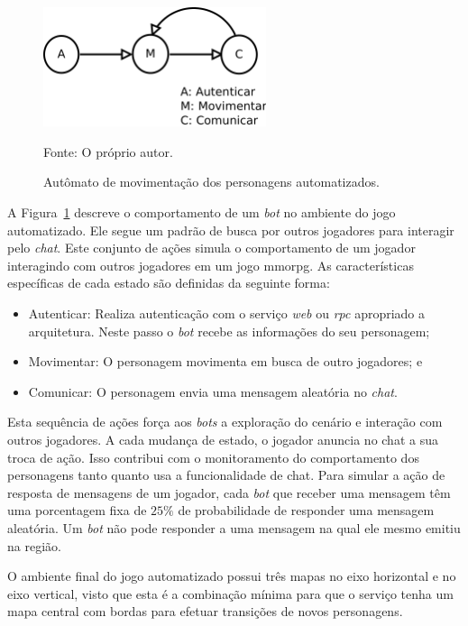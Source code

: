 \begin{figure}[htb!]
  \caption{Autômato de movimentação dos personagens automatizados.}
  \label{fig:movimentacao}
  \includegraphics[height=3.5cm]{img/cap3/movimentacao.png}
  \centering

  Fonte: O próprio autor.
\end{figure}

A Figura~\ref{fig:movimentacao} descreve o comportamento de um \textit{bot} no ambiente do jogo automatizado.
%
Ele segue um padrão de busca por outros jogadores para interagir pelo \textit{chat}.
%
Este conjunto de ações simula o comportamento de um jogador interagindo com outros jogadores em um jogo \ac{mmorpg}.
%
As características específicas de cada estado são definidas da seguinte forma:

\begin{itemize}
  \item Autenticar: Realiza autenticação com o serviço \textit{web} ou \textit{rpc} apropriado a arquitetura. Neste passo o \textit{bot} recebe as informações do seu personagem;
  \item Movimentar: O personagem movimenta em busca de outro jogadores; e
  \item Comunicar: O personagem envia uma mensagem aleatória no \textit{chat}.
\end{itemize}

Esta sequência de ações força aos \textit{bots} a exploração do cenário e interação com outros jogadores.
%
A cada mudança de estado, o jogador anuncia no chat a sua troca de ação.
%
Isso contribui com o monitoramento do comportamento dos personagens tanto quanto usa a funcionalidade de chat.
%
Para simular a ação de resposta de mensagens de um jogador, cada \textit{bot} que receber uma mensagem têm uma porcentagem fixa de $25\%$ de probabilidade de responder uma mensagem aleatória.
%
Um \textit{bot} não pode responder a uma mensagem na qual ele mesmo emitiu na região.

O ambiente final do jogo automatizado possui três mapas no eixo horizontal e no eixo vertical, visto que esta é a combinação mínima para que o serviço tenha um mapa central com bordas para efetuar transições de novos personagens.

